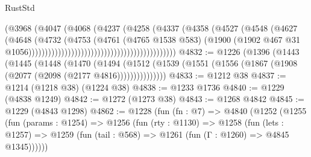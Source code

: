 \begin{lexlean}{RustStd}
\begin{coremodule}
                                                              (@3968
                                                                (@4047
                                                                  (@4068
                                                                    (@4237
                                                                      (@4258
                                                                        (@4337
                                                                          (@4358
                                                                            (@4527
                                                                              (@4548
                                                                                (@4627
                                                                                  (@4648
                                                                                    (@4732
                                                                                      (@4753
                                                                                        (@4761
                                                                                          (@4765
                                                                                            @1538
                                                                                            @583)
                                                                                          (@1900
                                                                                            (@1902
                                                                                              @467
                                                                                              @31
                                                                                              @1056)))))))))))))))))))))))))))))))))))))))))))))
@4832 := @1226
    (@1396
      (@1443
        (@1445
          (@1448
            (@1470
              (@1494
                (@1512 (@1539 (@1551 (@1556 (@1867 (@1908 (@2077 (@2098 (@2177 @4816)))))))))))))))
@4833 := @1212 @38
@4837 := @1214 (@1218 @38) (@1224 @38)
@4838 := @1233 @1736
@4840 := @1229 (@4838 @1249)
@4842 := @1272 (@1273 @38)
@4843 := @1268 @4842
@4845 := @1229 (@4843 @1298)
@4862 := @1228
    (fun (fn : @7) =>
    @4840
      (@1252
        (@1255
          (fun (params : @1254) =>
          @1256
            (fun (rty : @1130) =>
            @1258
              (fun (lets : @1257) =>
              @1259 (fun (tail : @568) => @1261 (fun (Γ : @1260) => @4845 @1345))))))

\end{coremodule}
\end{lexlean}
